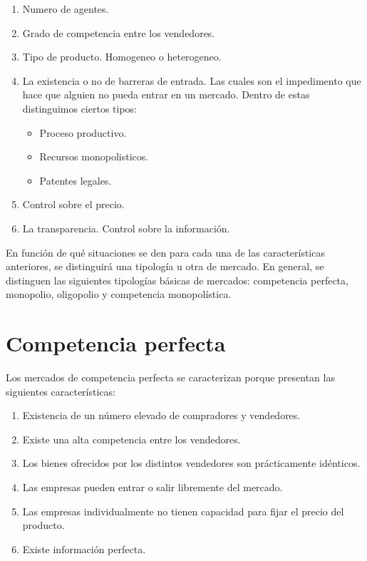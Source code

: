 \documentclass[
]{krantz}
\providecommand{\tightlist}{%
  \setlength{\itemsep}{0pt}\setlength{\parskip}{0pt}}
\begin{document}
\begin{enumerate}
\def\labelenumi{\arabic{enumi}.}
\tightlist
\item
  Numero de agentes.
\item
  Grado de competencia entre los vendedores.
\item
  Tipo de producto. Homogeneo o heterogeneo.
\item
  La existencia o no de barreras de entrada. Las cuales son el impedimento que hace que alguien no pueda entrar en un mercado. Dentro de estas distinguimos ciertos tipos:

  \begin{itemize}
  \tightlist
  \item
    Proceso productivo.
  \item
    Recursos monopolisticos.
  \item
    Patentes legales.
  \end{itemize}
\item
  Control sobre el precio.
\item
  La transparencia. Control sobre la información.
\end{enumerate}

En función de qué situaciones se den para cada una de las características anteriores, se distinguirá una tipología u otra de mercado. En general, se distinguen las siguientes tipologías básicas de mercados: competencia perfecta, monopolio, oligopolio y competencia monopolística.

\hypertarget{competencia-perfecta}{%
\section{Competencia perfecta}\label{competencia-perfecta}}

Los mercados de competencia perfecta se caracterizan porque presentan las siguientes características:

\begin{enumerate}
\def\labelenumi{\arabic{enumi}.}
\tightlist
\item
  Existencia de un número elevado de compradores y vendedores.
\item
  Existe una alta competencia entre los vendedores.
\item
  Los bienes ofrecidos por los distintos vendedores son prácticamente idénticos.
\item
  Las empresas pueden entrar o salir libremente del mercado.
\item
  Las empresas individualmente no tienen capacidad para fijar el precio del producto.
\item
  Existe información perfecta.
\end{enumerate}
\end{document}
